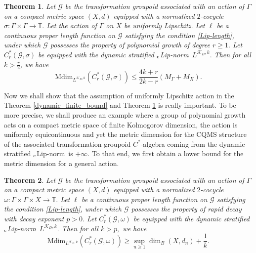 \documentclass[a4paper,11pt,reqno]{amsart}
\theoremstyle{plain}
\newtheorem{thm}{Theorem}[section]
\theoremstyle{mainthmstyle}
\theoremstyle{named}
\numberwithin{equation}{section}
\newcommand{\clipnorm}{$_{\text{\rm c}}$Lip-norm}
\begin{document}
\begin{thm}\label{dynamicbound}
Let $\mathcal{G}$ be the transformation groupoid associated with an action of $\Gamma$ on a compact metric space $(X, d)$ equipped with a normalized $2$-cocycle $\sigma : \Gamma \times \Gamma \rightarrow \mathbb T.$ Let the action of $\Gamma$ on $X$ be uniformly Lipschitz. Let $\ell$ be a continuous proper length function on $\mathcal G$ satisfying the condition \eqref{Lip-length}, under which $\mathcal G$ possesses the property of polynomial growth of degree $r \geq 1.$ Let $C_r^{\ast}(\mathcal {G}, \sigma)$ be equipped with the dynamic stratified \clipnorm\ $L^{\mathcal{K}_{D}, k}.$ Then for all $k > \frac{r}{2}$, we have
\begin{displaymath}\mathrm{Mdim}_{L^{\mathcal{K}_{D},k}} (C_r^{\ast}(\mathcal{G}, \sigma)) \leq  \frac {4 k + r} {2 k - r} \left( M_{\Gamma} + M_X \right). \end{displaymath}
\end{thm}

Now we shall show that the assumption of uniformly Lipschitz action in the Theorem \ref{dynamic_finite_bound} and Theorem \ref{dynamicbound} is really important. To be more precise, we shall produce an example where a group of polynomial growth acts on a compact metric space of finite Kolmogorov dimension, the action is uniformly equicontinuous and yet the metric dimension for the CQMS structure   of the associated transformation groupoid $C^{\ast}$-algebra coming from the dynamic stratified \clipnorm\ is $+\infty$. To that end, we first obtain a lower bound for the metric dimension for a general action.  


\begin{thm}
Let $\mathcal{G}$ be the transformation groupoid associated with an action of $\Gamma$ on a compact metric space $(X, d)$ equipped with a normalized $2$-cocycle $\omega : \Gamma \times \Gamma \times X \rightarrow \mathbb T.$ Let $\ell$ be a continuous proper length function on $\mathcal G$ satisfying the condition \eqref{Lip-length}, under which $\mathcal G$ possesses the property of rapid decay with decay exponent $p > 0.$ Let $C_r^{\ast}(\mathcal {G}, \omega)$ be equipped with the dynamic stratified \clipnorm\ $L^{\mathcal{K}_{D}, k}.$ Then for all $k > p,$ we have
$$\mathrm {Mdim}_{L^{\mathcal K_D, k}} \left (C_r^{\ast} (\mathcal G, \omega) \right) \geq \sup\limits_{n \geq 1} \dim_B (X, d_n) + \frac{1}{k}.$$
\end{thm}
\end{document}
